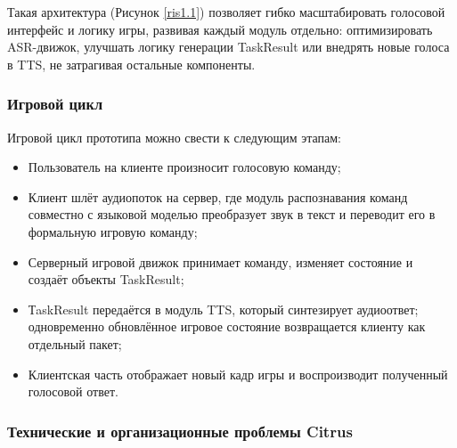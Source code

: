         Такая архитектура (Рисунок \ref{ris1.1}) позволяет гибко масштабировать голосовой интерфейс и логику игры, развивая каждый модуль отдельно: оптимизировать ASR-движок, улучшать логику генерации TaskResult или внедрять новые голоса в TTS, не затрагивая остальные компоненты.

        \subsubsection{Игровой цикл}

        Игровой цикл прототипа можно свести к следующим этапам:

        \begin{itemize}
            \item Пользователь на клиенте произносит голосовую команду;
            \item Клиент шлёт аудиопоток на сервер, где модуль распознавания команд совместно с языковой моделью преобразует звук в текст и переводит его в формальную игровую команду;
            \item Серверный игровой движок принимает команду, изменяет состояние и создаёт объекты TaskResult;
            \item ТaskResult передаётся в модуль TTS, который синтезирует аудиоответ; одновременно обновлённое игровое состояние возвращается клиенту как отдельный пакет;
            \item Клиентская часть отображает новый кадр игры и воспроизводит полученный голосовой ответ.
        \end{itemize}

        
        \subsubsection{Технические и организационные проблемы Citrus}

